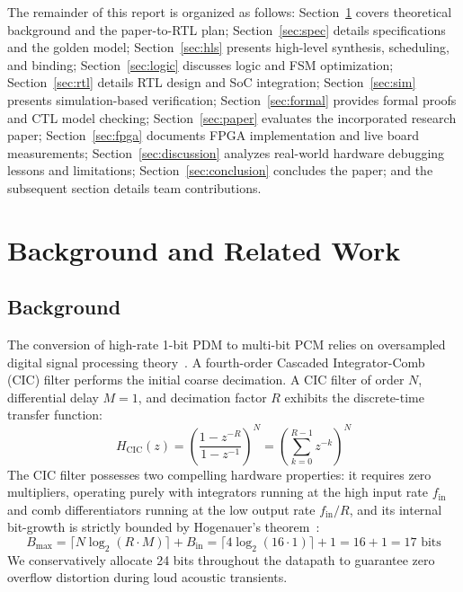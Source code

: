 \documentclass[11pt,a4paper]{article}
\begin{document}
The remainder of this report is organized as follows: Section~\ref{sec:related} covers theoretical background and the paper-to-RTL plan; Section~\ref{sec:spec} details specifications and the golden model; Section~\ref{sec:hls} presents high-level synthesis, scheduling, and binding; Section~\ref{sec:logic} discusses logic and FSM optimization; Section~\ref{sec:rtl} details RTL design and SoC integration; Section~\ref{sec:sim} presents simulation-based verification; Section~\ref{sec:formal} provides formal proofs and CTL model checking; Section~\ref{sec:paper} evaluates the incorporated research paper; Section~\ref{sec:fpga} documents FPGA implementation and live board measurements; Section~\ref{sec:discussion} analyzes real-world hardware debugging lessons and limitations; Section~\ref{sec:conclusion} concludes the paper; and the subsequent section details team contributions.

\section{Background and Related Work}
\label{sec:related}

\subsection{Background}
The conversion of high-rate 1-bit PDM to multi-bit PCM relies on oversampled digital signal processing theory~\cite{hogenauer1981,dolecek2009}. A fourth-order Cascaded Integrator-Comb (CIC) filter performs the initial coarse decimation. A CIC filter of order $N$, differential delay $M=1$, and decimation factor $R$ exhibits the discrete-time transfer function:
\begin{equation}
  H_{\text{CIC}}(z) = \left( \frac{1 - z^{-R}}{1 - z^{-1}} \right)^N = \left( \sum_{k=0}^{R-1} z^{-k} \right)^N
  \label{eq:cic_tf}
\end{equation}
The CIC filter possesses two compelling hardware properties: it requires zero multipliers, operating purely with integrators running at the high input rate $f_{\text{in}}$ and comb differentiators running at the low output rate $f_{\text{in}}/R$, and its internal bit-growth is strictly bounded by Hogenauer's theorem~\cite{hogenauer1981}:
\begin{equation}
  B_{\text{max}} = \lceil N \log_2(R \cdot M) \rceil + B_{\text{in}} = \lceil 4 \log_2(16 \cdot 1) \rceil + 1 = 16 + 1 = 17\text{ bits}
  \label{eq:hogenauer}
\end{equation}
We conservatively allocate 24 bits throughout the datapath to guarantee zero overflow distortion during loud acoustic transients.
\end{document}
